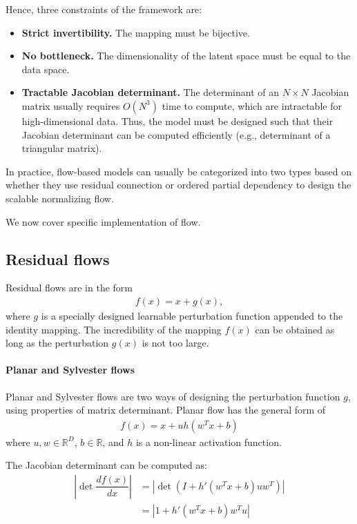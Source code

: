 \documentclass{mytufte-light}
\begin{document}
Hence, three constraints of the framework are:
\begin{itemize}
    \item \textbf{Strict invertibility.} The mapping must be bijective.
    \item \textbf{No bottleneck.} The dimensionality of the latent space must be equal to the data space.
    \item \textbf{Tractable Jacobian determinant.} 
    The determinant of an \( N\times N \) Jacobian matrix 
    usually requires \( O(N^3) \) time to compute, which are intractable for high-dimensional data.
    Thus, the model must be designed such that their Jacobian determinant can be computed efficiently
    (e.g., determinant of a triangular matrix).
\end{itemize}
In practice, flow-based models can usually be categorized into two types based on whether they use
residual connection or ordered partial dependency to design 
the scalable normalizing flow.

We now cover specific implementation of flow.

\subsection{Residual flows}

Residual flows are in the form 
\begin{align}
    f(x) = x + g(x),
\end{align}
where \( g \) is a specially designed 
learnable perturbation function appended to the identity mapping.
The incredibility of the mapping \( f(x) \) can be obtained 
as long as the perturbation \( g(x) \) is not too large.


\paragraph{
 Planar and Sylvester flows
}
Planar and Sylvester flows are two ways of designing 
the perturbation function \( g \), using properties of matrix determinant.
Planar flow has the general form of 
\begin{align}
    f(x) = x + u h(w^T x + b)
\end{align}
where \( u, w \in \mathbb{R}^D \), \( b \in \mathbb{R} \), and \( h \) is a non-linear activation function.

The Jacobian determinant can be computed as:
\begin{align}
    \left| \det \dfrac{df(x)}{dx} \right| &= \left| \det (I + h'(w^T x + b) u w^T) \right|\\
    &= \left| 1 + h'(w^T x + b) w^T u \right|
\end{align}
\end{document}
